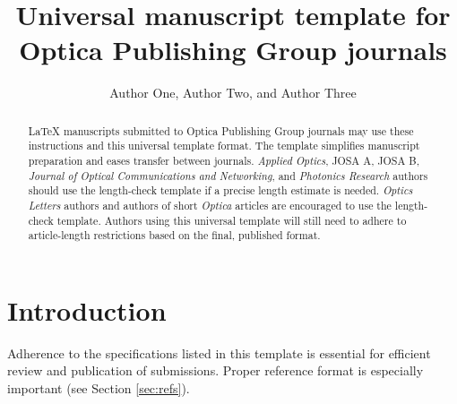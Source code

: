 \documentclass{optica-article}
\begin{document}
\title{Universal manuscript template for Optica Publishing Group journals}

\author{Author One, Author Two, and Author Three}

\address{Peer Review, Publications Department, Optica Publishing Group, 2010 Massachusetts Avenue NW, Washington, DC 20036, USA\\
Publications Department, Optica Publishing Group, 2010 Massachusetts Avenue NW, Washington, DC 20036, USA\\
Currently with the Department of Electronic Journals, Optica Publishing Group, 2010 Massachusetts Avenue NW, Washington, DC 20036, USA}




\begin{abstract}
\LaTeX{} manuscripts submitted to Optica Publishing Group journals may use these instructions and this universal template format. The template simplifies manuscript preparation and eases transfer between journals. \emph{Applied Optics}, JOSA A, JOSA B, \emph{Journal of Optical Communications and Networking}, and \emph{Photonics Research} authors should use the length-check template if a precise length estimate is needed. \emph{Optics Letters} authors and authors of short \emph{Optica} articles are encouraged to use the length-check template. Authors using this universal template will still need to adhere to article-length restrictions based on the final, published format.
\end{abstract}

\section{Introduction}
Adherence to the specifications listed in this template is essential for efficient review and publication of submissions. Proper reference format is especially important (see Section \ref{sec:refs}).
\end{document}
